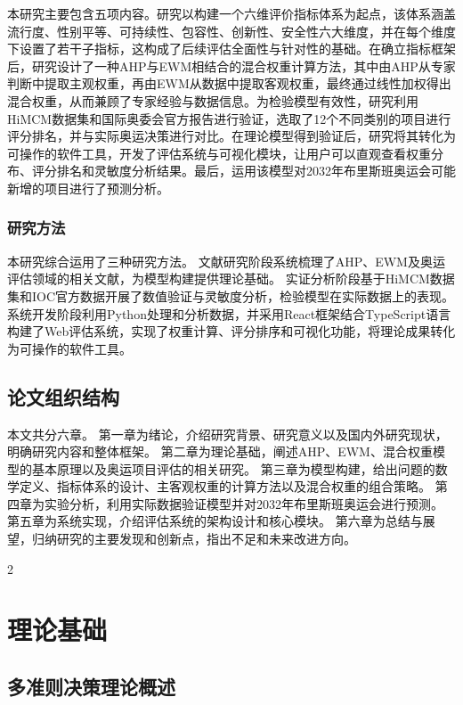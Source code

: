 \documentclass[twoside]{CUGThesis}
\begin{document}
本研究主要包含五项内容。研究以构建一个六维评价指标体系为起点，该体系涵盖流行度、性别平等、可持续性、包容性、创新性、安全性六大维度，并在每个维度下设置了若干子指标，这构成了后续评估全面性与针对性的基础。在确立指标框架后，研究设计了一种AHP与EWM相结合的混合权重计算方法，其中由AHP从专家判断中提取主观权重，再由EWM从数据中提取客观权重，最终通过线性加权得出混合权重，从而兼顾了专家经验与数据信息。为检验模型有效性，研究利用HiMCM数据集和国际奥委会官方报告进行验证，选取了12个不同类别的项目进行评分排名，并与实际奥运决策进行对比。在理论模型得到验证后，研究将其转化为可操作的软件工具，开发了评估系统与可视化模块，让用户可以直观查看权重分布、评分排名和灵敏度分析结果。最后，运用该模型对2032年布里斯班奥运会可能新增的项目进行了预测分析。

\subsubsection{研究方法}

本研究综合运用了三种研究方法。
文献研究阶段系统梳理了AHP、EWM及奥运评估领域的相关文献，为模型构建提供理论基础。
实证分析阶段基于HiMCM数据集和IOC官方数据开展了数值验证与灵敏度分析，检验模型在实际数据上的表现。
系统开发阶段利用Python处理和分析数据，并采用React框架结合TypeScript语言构建了Web评估系统，实现了权重计算、评分排序和可视化功能，将理论成果转化为可操作的软件工具。

\subsection{论文组织结构}

本文共分六章。
第一章为绪论，介绍研究背景、研究意义以及国内外研究现状，明确研究内容和整体框架。
第二章为理论基础，阐述AHP、EWM、混合权重模型的基本原理以及奥运项目评估的相关研究。
第三章为模型构建，给出问题的数学定义、指标体系的设计、主客观权重的计算方法以及混合权重的组合策略。
第四章为实验分析，利用实际数据验证模型并对2032年布里斯班奥运会进行预测。
第五章为系统实现，介绍评估系统的架构设计和核心模块。
第六章为总结与展望，归纳研究的主要发现和创新点，指出不足和未来改进方向。


\begin{spacing}{2}\section{理论基础}\end{spacing}

\subsection{多准则决策理论概述}
\end{document}
